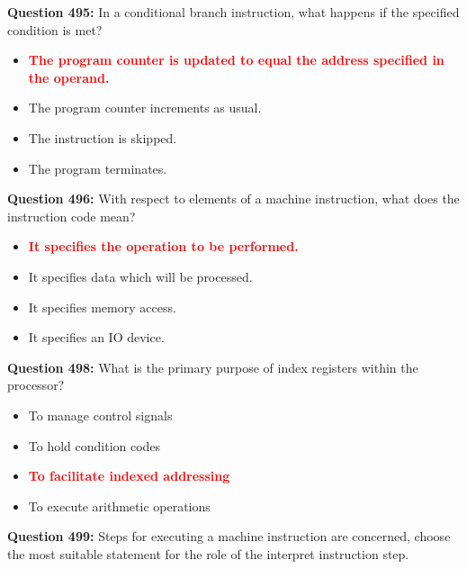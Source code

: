 \documentclass[12pt,a4paper]{article}
\begin{document}
\textbf{Question 495:} In a conditional branch instruction, what happens if the specified condition is met?

\begin{itemize}
    \item[\textbf{A.}] \textcolor{red}{\textbf{The program counter is updated to equal the address specified in the operand.}}
    \item[\textbf{B.}] The program counter increments as usual.
    \item[\textbf{C.}] The instruction is skipped.
    \item[\textbf{D.}] The program terminates.
\end{itemize}

\vspace{0.5cm}

\textbf{Question 496:} With respect to elements of a machine instruction, what does the instruction code mean?

\begin{itemize}
    \item[\textbf{A.}] \textcolor{red}{\textbf{It specifies the operation to be performed.}}
    \item[\textbf{B.}] It specifies data which will be processed.
    \item[\textbf{C.}] It specifies memory access.
    \item[\textbf{D.}] It specifies an IO device.
\end{itemize}

\vspace{0.5cm}

\textbf{Question 498:} What is the primary purpose of index registers within the processor?

\begin{itemize}
    \item[\textbf{A.}] To manage control signals
    \item[\textbf{B.}] To hold condition codes
    \item[\textbf{C.}] \textcolor{red}{\textbf{To facilitate indexed addressing}}
    \item[\textbf{D.}] To execute arithmetic operations
\end{itemize}

\vspace{0.5cm}

\textbf{Question 499:} Steps for executing a machine instruction are concerned, choose the most suitable statement for the role of the interpret instruction step.
\end{document}
